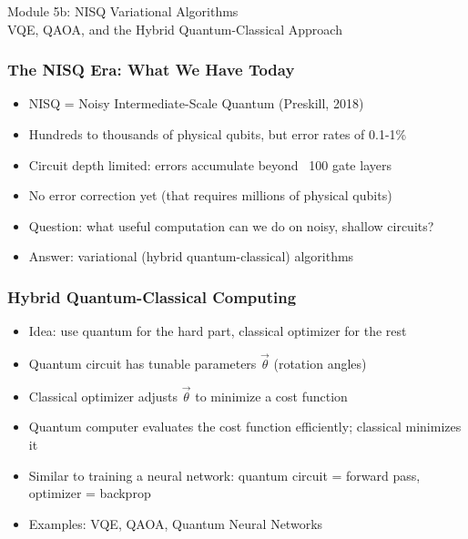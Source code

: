
\begin{frame}[fragile]\frametitle{}
\begin{center}
{\Large Module 5b: NISQ Variational Algorithms}\\[0.5em]
{\large VQE, QAOA, and the Hybrid Quantum-Classical Approach}
\end{center}
\end{frame}

\begin{frame}[fragile]\frametitle{The NISQ Era: What We Have Today}
\begin{itemize}
\item NISQ = Noisy Intermediate-Scale Quantum (Preskill, 2018)
\item Hundreds to thousands of physical qubits, but error rates of 0.1-1\%
\item Circuit depth limited: errors accumulate beyond ~100 gate layers
\item No error correction yet (that requires millions of physical qubits)
\item Question: what useful computation can we do on noisy, shallow circuits?
\item Answer: variational (hybrid quantum-classical) algorithms
\end{itemize}
\end{frame}

\begin{frame}[fragile]\frametitle{Hybrid Quantum-Classical Computing}
\begin{itemize}
\item Idea: use quantum for the hard part, classical optimizer for the rest
\item Quantum circuit has tunable parameters $\vec{\theta}$ (rotation angles)
\item Classical optimizer adjusts $\vec{\theta}$ to minimize a cost function
\item Quantum computer evaluates the cost function efficiently; classical minimizes it
\item Similar to training a neural network: quantum circuit = forward pass, optimizer = backprop
\item Examples: VQE, QAOA, Quantum Neural Networks
\end{itemize}
\end{frame}

